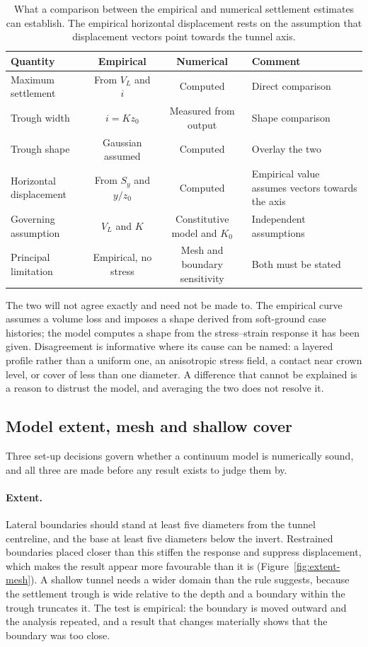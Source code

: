\begin{table}[htbp]
\caption{What a comparison between the empirical and numerical settlement
estimates can establish. The empirical horizontal displacement rests on the
assumption that displacement vectors point towards the tunnel axis.}
\label{tab:comparison}
\centering
\small
\begin{tabularx}{\textwidth}{l c c X}
\toprule
\textbf{Quantity} & \textbf{Empirical} & \textbf{Numerical} & \textbf{Comment} \\
\midrule
Maximum settlement & From $V_L$ and $i$ & Computed & Direct comparison \\
Trough width & $i = K z_0$ & Measured from output & Shape comparison \\
Trough shape & Gaussian assumed & Computed & Overlay the two \\
Horizontal displacement & From $S_y$ and $y/z_0$ & Computed & Empirical value assumes vectors towards the axis \\
Governing assumption & $V_L$ and $K$ & Constitutive model and $K_0$ & Independent assumptions \\
Principal limitation & Empirical, no stress & Mesh and boundary sensitivity & Both must be stated \\
\bottomrule
\end{tabularx}
\end{table}

The two will not agree exactly and need not be made to.
The empirical curve assumes a volume loss and imposes a shape derived from
soft-ground case histories; the model computes a shape from the stress--strain
response it has been given. Disagreement is informative where its cause can be
named: a layered profile rather than a uniform one, an anisotropic stress
field, a contact near crown level, or cover of less than one diameter. A
difference that cannot be explained is a reason to distrust the model, and
averaging the two does not resolve it.

\subsection{Model extent, mesh and shallow cover}
\label{sec:model-extent-mesh}

Three set-up decisions govern whether a continuum model is numerically sound,
and all three are made before any result exists to judge them by.

\paragraph{Extent.}
Lateral boundaries should stand at least five diameters from the tunnel
centreline, and the base at least five diameters below the invert. Restrained
boundaries placed closer than this stiffen the response and suppress
displacement, which makes the result appear more favourable than it is
(Figure~\ref{fig:extent-mesh}). A shallow tunnel needs a wider domain
than the rule suggests, because the settlement trough is wide relative to the
depth and a boundary within the trough truncates it. The test is empirical:
the boundary is moved outward and the analysis repeated, and a result that
changes materially shows that the boundary was too close.

